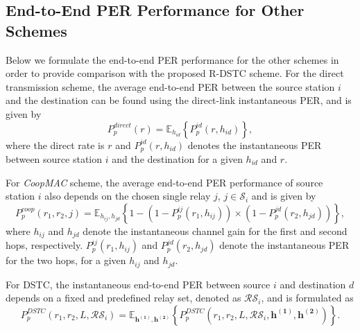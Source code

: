 \documentclass[peerreview,draftcls,onecolumn,12pt,a4paper]{IEEEtran}
\begin{document}
\vspace{-0.15in}
\subsection{End-to-End PER Performance for Other Schemes}\label{sec:end2end}
\vspace{-0.05in}

Below we formulate the end-to-end PER performance for the other
schemes in order to provide comparison with the proposed R-DSTC scheme.
For the direct transmission scheme, the average end-to-end PER
between the source station $i$ and the destination can be found
using the direct-link instantaneous PER, and is given by
\begin{equation}
P_{p}^{direct}(r)=\mathbb{E}_{h_{id}}\left\{P_{p}^{id}(r,
h_{id})\right\},\label{eq:e2eperdirect}
\end{equation} where the direct rate is $r$ and $P_{p}^{id}(r, h_{id})$ denotes the
instantaneous PER between source station $i$ and the destination
for a given $h_{id}$ and $r$.

For \emph{CoopMAC} scheme, the average end-to-end PER performance
of source station $i$ also depends on the chosen single relay $j$,
$j \in \mathcal{S}_i$ and is given by
\begin{equation}
P_{p}^{coop}(r_1, r_2,j)=\mathbb{E}_{h_{ij}, h_{jd}}\left\{
1-\left(1-P_{p}^{ij}(r_1,h_{ij})\right) \times
\left(1-P_{p}^{jd}(r_2,h_{jd})\right)\right\}, \label{eq:percoop}
\end{equation}
where $h_{ij}$ and $h_{jd}$ denote the instantaneous channel gain
for the first and second hops, respectively. $P_{p}^{ij}(r_1,
h_{ij})$ and $P_{p}^{jd} (r_2, h_{jd})$ denote the instantaneous
PER for the two hops, for a given $h_{ij}$ and $h_{jd}$.

For DSTC, the instantaneous end-to-end PER between source $i$ and destination $d$ depends
on a fixed and predefined relay set, denoted as $\mathcal{RS}_i$,
and is formulated as
\begin{equation}
P_p^{DSTC}(r_1, r_2,L, \mathcal{RS}_i) = \mathbb{E}_{
{\mathbf{h^{(1)}}}, \mathbf{h^{(2)}}}\left\{P_{p}^{DSTC}(r_1, r_2,
L, \mathcal{RS}_i,{\mathbf{h^{(1)}}}, \mathbf{h^{(2)}})\right\}.
\label{eq:dstce2ePEP}
\end{equation}
\end{document}

